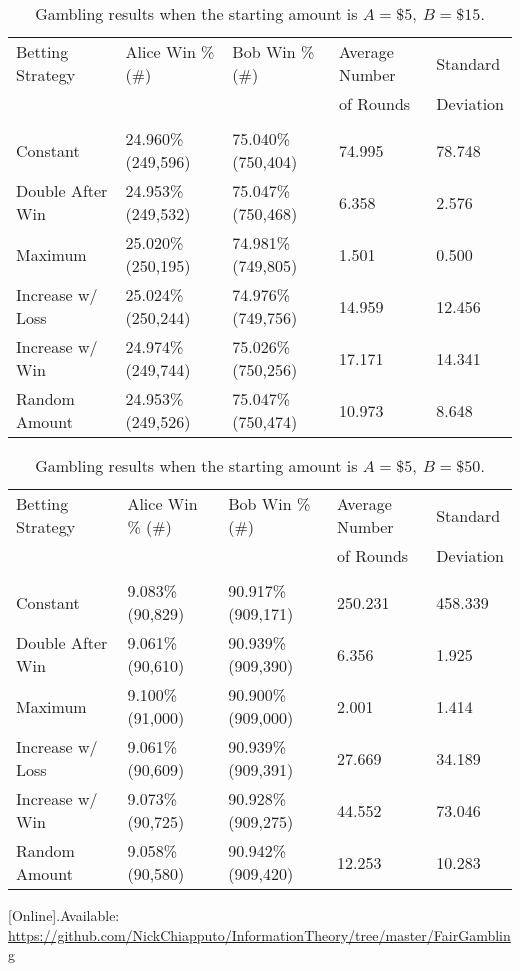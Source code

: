 \documentclass[12pt]{article}
\begin{document}
		\begin{table}[H]
			\begin{center}
				\begin{tabular}{l|l|l|l|l}
					Betting Strategy 	& Alice Win \% (\#) 	& Bob Win \% (\#)		& Average Number 	& Standard  	\\
										&						&						& of Rounds 		& Deviation				\\
					\hline
					\vspace{ -0.15in }	&						&						&					&	\\
					Constant 			& 24.960\% (249,596)	& 75.040\% (750,404)	& 74.995			& 78.748	\\
					Double After Win	& 24.953\% (249,532)	& 75.047\% (750,468)	& 6.358				& 2.576	\\
					Maximum				& 25.020\% (250,195)	& 74.981\% (749,805)	& 1.501				& 0.500	\\
					Increase w/ Loss 	& 25.024\% (250,244)	& 74.976\% (749,756)	& 14.959			& 12.456	\\
					Increase w/ Win		& 24.974\% (249,744)	& 75.026\% (750,256)	& 17.171			& 14.341	\\
					Random Amount 		& 24.953\% (249,526)	& 75.047\% (750,474)	& 10.973			& 8.648	\\
				\end{tabular}
				\caption{Gambling results when the starting amount is $A = \$5,\ B = \$15$.}
				\label{tab:3a-b}
			\end{center}
		\end{table}

		\begin{table}[H]
			\begin{center}
				\begin{tabular}{l|l|l|l|l}
					Betting Strategy 	& Alice Win \% (\#) 	& Bob Win \% (\#)		& Average Number 	& Standard  	\\
										&						&						& of Rounds 		& Deviation				\\
					\hline
					\vspace{ -0.15in }	&						&						&					&	\\
					Constant 			& 9.083\% (90,829)		& 90.917\% (909,171)	& 250.231			& 458.339	\\
					Double After Win	& 9.061\% (90,610)		& 90.939\% (909,390)	& 6.356				& 1.925	\\
					Maximum				& 9.100\% (91,000)		& 90.900\% (909,000)	& 2.001				& 1.414	\\
					Increase w/ Loss 	& 9.061\% (90,609)		& 90.939\% (909,391)	& 27.669			& 34.189	\\
					Increase w/ Win		& 9.073\% (90,725)		& 90.928\% (909,275)	& 44.552			& 73.046	\\
					Random Amount 		& 9.058\% (90,580)		& 90.942\% (909,420)	& 12.253			& 10.283 	\\
				\end{tabular}
				\caption{Gambling results when the starting amount is $A = \$5,\ B = \$50$.}
				\label{tab:10a-b}
			\end{center}
		\end{table}

	\begin{thebibliography}{00}
		 [Online].Available: \url{https://github.com/NickChiapputo/InformationTheory/tree/master/FairGambling}
	\end{thebibliography}
\end{document}
